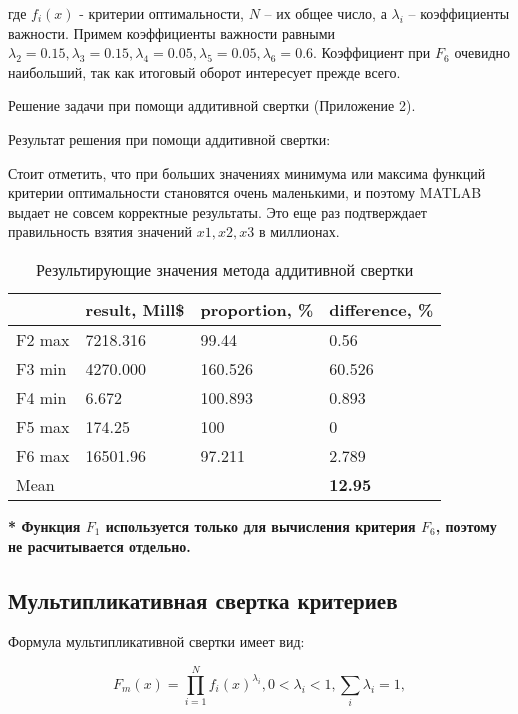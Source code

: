 где $f_i(x)$ - критерии оптимальности, $N$ – их общее число, а $\lambda_i$ -- коэффициенты важности. Примем коэффициенты важности равными $\lambda_2=0.15, \lambda_3=0.15, \lambda_4=0.05, \lambda_5=0.05, \lambda_6=0.6$. Коэффициент при $F_6$ очевидно наибольший, так как итоговый оборот интересует прежде всего.

Решение задачи при помощи аддитивной свертки (Приложение 2).

Результат решения при помощи аддитивной свертки:



Стоит отметить, что при больших значениях минимума или максима функций критерии оптимальности становятся очень маленькими, и поэтому MATLAB выдает не совсем корректные результаты. Это еще раз подтверждает правильность взятия значений $x1, x2, x3$ в миллионах.

\begin{table}[h!]
	\centering
	\bgroup
	\captionsetup{singlelinecheck = false, format= hang, justification=raggedleft, font=footnotesize, labelsep=space}
	\caption{Результирующие значения метода аддитивной свертки}
	\def\arraystretch{1}
	\begin{tabular}{ | m{1.5cm} | m{1.9cm} | m{2.2cm} | m{2.2cm} | }
		\hline
		& result, Mill\$ & proportion, \% & difference, \% \\ \hline
		F2 max & 7218.316 & 99.44 & 0.56 \\ \hline
		F3 min & 4270.000 & 160.526 & 60.526 \\ \hline
		F4 min & 6.672 & 100.893 & 0.893 \\ \hline
		F5 max & 174.25 & 100 & 0 \\ \hline
		F6 max & 16501.96 & 97.211 & 2.789 \\ \hline
		Mean & & & \textbf{12.95} \\
		\hline
	\end{tabular}
	\egroup
\end{table}

\textbf{* Функция $F_1$ используется только для вычисления критерия $F_6$, поэтому не расчитывается отдельно.}

\subsection{Мультипликативная свертка критериев}

Формула мультипликативной свертки имеет вид:

\begin{equation*}
\text{$F_m(x)=\prod_{i=1}^{N}f_i(x)^{\lambda_i}, 0<\lambda_i<1,\sum_{i}^{}\lambda_i=1,$}
\end{equation*}

